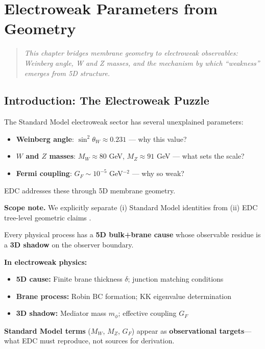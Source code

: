 \chapter{Electroweak Parameters from Geometry}
\label{ch:electroweak}

\begin{quote}
\textit{This chapter bridges membrane geometry to electroweak observables:
Weinberg angle, W and Z masses, and the mechanism by which ``weakness''
emerges from 5D structure.}
\end{quote}

\section{Introduction: The Electroweak Puzzle}
\label{sec:ew_intro}

The Standard Model electroweak sector has several unexplained parameters:
\begin{itemize}[nosep]
\item \textbf{Weinberg angle}: $\sin^2\theta_W \approx 0.231$ --- why this value?
\item \textbf{$W$ and $Z$ masses}: $M_W \approx 80$ GeV, $M_Z \approx 91$ GeV --- what sets the scale?
\item \textbf{Fermi coupling}: $G_F \sim 10^{-5}$ GeV$^{-2}$ --- why so weak?
\end{itemize}

EDC addresses these through 5D membrane geometry.

\medskip
\noindent\textbf{Scope note.}
We explicitly separate (i) Standard Model identities \tagM{} from (ii) EDC tree-level geometric claims \tagDcApprox{}.

\begin{tcolorbox}[colback=blue!3!white, colframe=blue!50!black,
    title=\textbf{EDC Projection Principle}]
Every physical process has a \textbf{5D bulk+brane cause} whose observable
residue is a \textbf{3D shadow} on the observer boundary.

\textbf{In electroweak physics:}
\begin{itemize}[nosep]
    \item \textbf{5D cause:} Finite brane thickness $\delta$; junction matching conditions
    \item \textbf{Brane process:} Robin BC formation; KK eigenvalue determination
    \item \textbf{3D shadow:} Mediator mass $m_\phi$; effective coupling $G_F$
\end{itemize}

\textbf{Standard Model terms} ($M_W$, $M_Z$, $G_F$) appear as \textbf{observational
targets}---what EDC must reproduce, not sources for derivation.
\end{tcolorbox}

